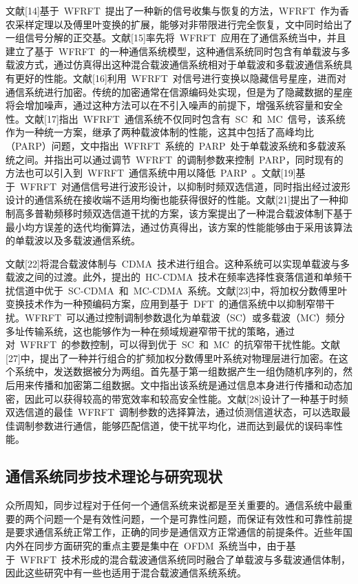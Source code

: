 文献[14]基于~WFRFT~提出了一种新的信号收集与恢复的方法，WFRFT~作为香农采样定理以及傅里叶变换的扩展，能够对非带限进行完全恢复，文中同时给出了一组信号分解的正交基。文献[15]率先将~WFRFT~应用在了通信系统当中，并且建立了基于~WFRFT~的一种通信系统模型，这种通信系统同时包含有单载波与多载波方式，通过仿真得出这种混合载波通信系统相对于单载波和多载波通信系统具有更好的性能。文献[16]利用~WFRFT~对信号进行变换以隐藏信号星座，进而对通信系统进行加密。传统的加密通常在信源编码处实现，但是为了隐藏数据的星座将会增加噪声，通过这种方法可以在不引入噪声的前提下，增强系统容量和安全性。文献[17]指出~WFRFT~通信系统不仅同时包含有~SC~和~MC~信号，该系统作为一种统一方案，继承了两种载波体制的性能，这其中包括了高峰均比（PARP）问题，文中指出~WFRFT~系统的~PARP~处于单载波系统和多载波系统之间。并指出可以通过调节~WFRFT~的调制参数来控制~PARP，同时现有的方法也可以引入到~WFRFT~通信系统中用以降低~PARP~。文献[19]基于~WFRFT~对通信信号进行波形设计，以抑制时频双选信道，同时指出经过波形设计的通信系统在接收端不适用均衡也能获得很好的性能。文献[21]提出了一种抑制高多普勒频移时频双选信道干扰的方案，该方案提出了一种混合载波体制下基于最小均方误差的迭代均衡算法，通过仿真得出，该方案的性能能够由于采用该算法的单载波以及多载波通信系统。

文献[22]将混合载波体制与~CDMA~技术进行组合。这种系统可以实现单载波与多载波之间的过渡。此外，提出的~HC-CDMA~技术在频率选择性衰落信道和单频干扰信道中优于~SC-CDMA~和~MC-CDMA~系统。文献[23]中，将加权分数傅里叶变换技术作为一种预编码方案，应用到基于~DFT~的通信系统中以抑制窄带干扰。WFRFT~可以通过控制调制参数退化为单载波（SC）或多载波（MC）频分多址传输系统，这也能够作为一种在频域规避窄带干扰的策略，通过对~WFRFT~的参数控制，可以得到优于~SC~和~MC~的抗窄带干扰性能。文献[27]中，提出了一种并行组合的扩频加权分数傅里叶系统对物理层进行加密。在这个系统中，发送数据被分为两组。首先基于第一组数据产生一组伪随机序列的，然后用来传播和加密第二组数据。文中指出该系统是通过信息本身进行传播和动态加密，因此可以获得较高的带宽效率和较高安全性能。文献[28]设计了一种基于时频双选信道的最佳~WFRFT~调制参数的选择算法，通过侦测信道状态，可以选取最佳调制参数进行通信，能够匹配信道，使干扰平均化，进而达到最优的误码率性能。

\subsection{通信系统同步技术理论与研究现状}
众所周知，同步过程对于任何一个通信系统来说都是至关重要的。通信系统中最重要的两个问题一个是有效性问题，一个是可靠性问题，而保证有效性和可靠性前提是要求通信系统正常工作，正确的同步是通信双方正常通信的前提条件。近些年国内外在同步方面研究的重点主要是集中在~OFDM~系统当中，由于基于~WFRFT~技术形成的混合载波通信系统同时融合了单载波与多载波通信体制，因此这些研究中有一些也适用于混合载波通信系统系统。

